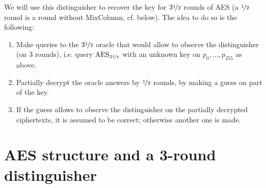 \documentclass[a4paper,11pt]{article}
\DeclareMathOperator\AES{AES}
\begin{document}
We will use this distinguisher to recover the key for $3\nicefrac{1}{2}$ rounds of AES (a $\nicefrac{1}{2}$ round is a round
without MixColumn, cf. below). The idea to do so is the following:
\begin{enumerate}
\item Make queries to the $3\nicefrac{1}{2}$ oracle that would allow to observe the distinguisher (on $3$ rounds), i.e. query $\AES_{3\nicefrac{1}{2}}$
with an unknown key on $p_0, \ldots, p_{255}$ as above.
\item Partially decrypt the oracle answers by $\nicefrac{1}{2}$ rounds, by making a guess on part of the key.
\item If the guess allows to observe the distinguisher on the partially decrypted ciphertexts, it is assumed to be correct; otherwise another one is made.
\end{enumerate}

\section*{AES structure and a 3-round distinguisher}
\end{document}
